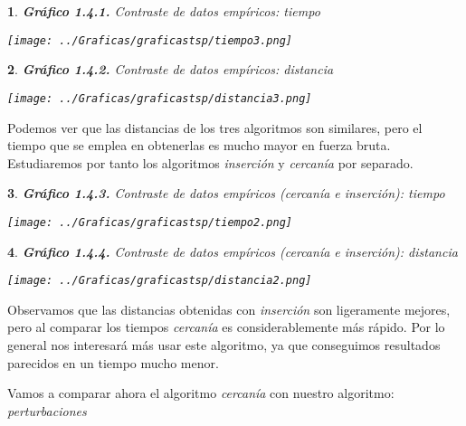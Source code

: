 \documentclass[10pt, a4paper]{article}
\theoremstyle{theorem-style}
\newtheorem*{datos}{}
\theoremstyle{theorem-style}
\theoremstyle{definition-style}
\theoremstyle{remark-style}
\theoremstyle{example-style}
\theoremstyle{definition-style}
\theoremstyle{remark-style}
\begin{document}
\begin{datos}
	{\bf\sffamily Gráfico 1.4.1.} {\sffamily Contraste de datos empíricos: tiempo}\\
	\vspace{-0.7cm}
	\begin{center}
		\texttt{[image: ../Graficas/graficastsp/tiempo3.png]}
	\end{center}	
\end{datos}
\pagebreak
\begin{datos}
	{\bf\sffamily Gráfico 1.4.2.} {\sffamily Contraste de datos empíricos: distancia}\\
	\vspace{-0.7cm}
	\begin{center}
		\texttt{[image: ../Graficas/graficastsp/distancia3.png]}
	\end{center}	
\end{datos}
Podemos ver que las distancias de los tres algoritmos son similares, pero el tiempo que se emplea en obtenerlas es mucho mayor en fuerza bruta. Estudiaremos por tanto los algoritmos \emph{inserción} y \emph{cercanía} por separado. 

\begin{datos}
	{\bf\sffamily Gráfico 1.4.3.} {\sffamily Contraste de datos empíricos (cercanía e inserción): tiempo}\\
	\vspace{-0.7cm}
	\begin{center}
		\texttt{[image: ../Graficas/graficastsp/tiempo2.png]}
	\end{center}	
\end{datos}
\pagebreak
\begin{datos}
	{\bf\sffamily Gráfico 1.4.4.} {\sffamily Contraste de datos empíricos (cercanía e inserción): distancia}\\
	\vspace{-0.7cm}
	\begin{center}
		\texttt{[image: ../Graficas/graficastsp/distancia2.png]}
	\end{center}	
\end{datos}

Observamos que las distancias obtenidas con \emph{inserción} son ligeramente mejores, pero al comparar los tiempos \emph{cercanía} es considerablemente más rápido. Por lo general nos interesará más usar este algoritmo, ya que conseguimos resultados parecidos en un tiempo mucho menor. 

Vamos a comparar ahora el algoritmo \emph{cercanía} con nuestro algoritmo: \emph{perturbaciones}
\end{document}
